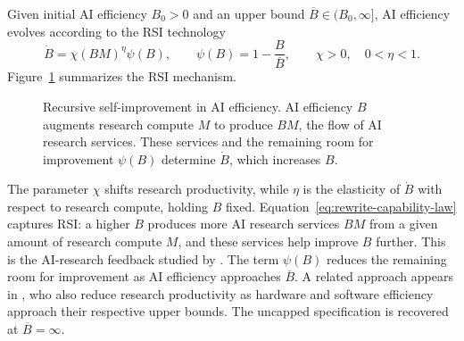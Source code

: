 Given initial AI efficiency \(B_0>0\) and an upper bound
\(\overline B\in(B_0,\infty]\), AI efficiency evolves according to the RSI technology
\begin{equation}
 \dot B=\chi(BM)^\eta\psi(B),
 \qquad
 \psi(B)=
  1-\frac{B}{\overline B},
 \qquad \chi>0,\quad0<\eta<1.
 \label{eq:rewrite-capability-law}
\end{equation}
Figure~\ref{fig:rewrite-capability-flow} summarizes the RSI mechanism.
\begin{figure}[H]
 \centering
 \caption{Recursive self-improvement in AI efficiency. AI efficiency $B$ augments
 research compute $M$ to produce $BM$, the flow of AI research services. These services and the remaining
 room for improvement $\psi(B)$ determine \(\dot B\), which increases $B$.}
 \label{fig:rewrite-capability-flow}
\end{figure}
The parameter \(\chi\) shifts research productivity, while \(\eta\) is the elasticity of \(\dot B\) with respect to research compute, holding $B$ fixed. Equation~\eqref{eq:rewrite-capability-law} captures RSI: a higher $B$ produces more AI research services $BM$ from a given amount of research compute $M$, and these services help improve $B$ further. This is the AI-research feedback studied by \citet{davidsonetal2026}. The term \(\psi(B)\) reduces the remaining room for improvement as AI efficiency approaches \(\overline B\). A related approach appears in \citet{erdiletal2025gate}, who also reduce research productivity as hardware and software efficiency approach their respective upper bounds. The uncapped specification is recovered at \(\overline B=\infty\).

